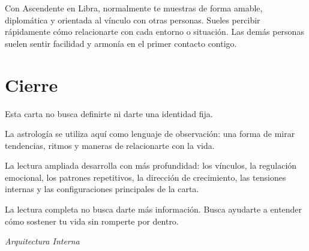 \documentclass[11pt,a4paper]{article}
\begin{document}
Con Ascendente en Libra, normalmente te muestras de forma amable, diplomática y orientada al vínculo con otras personas. Sueles percibir rápidamente cómo relacionarte con cada entorno o situación. Las demás personas suelen sentir facilidad y armonía en el primer contacto contigo.

\vspace{0.8cm}


\section{Cierre}

Esta carta no busca definirte ni darte una identidad fija.

La astrología se utiliza aquí como lenguaje de observación:
una forma de mirar tendencias, ritmos y maneras de relacionarte con la vida.

La lectura ampliada desarrolla con más profundidad:
los vínculos,
la regulación emocional,
los patrones repetitivos,
la dirección de crecimiento,
las tensiones internas
y las configuraciones principales de la carta.

La lectura completa no busca darte más información.
Busca ayudarte a entender cómo sostener tu vida sin romperte por dentro.

\vspace{1cm}

\begin{center}

{\small\itshape\color{grisai}
Arquitectura Interna
}

\end{center}
\end{document}
